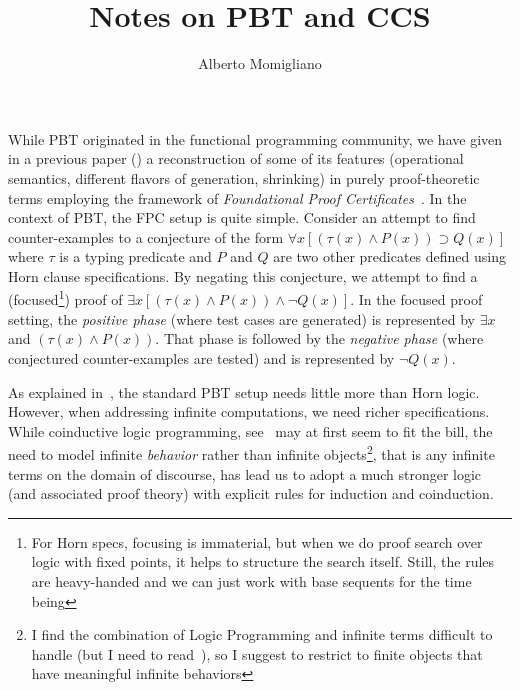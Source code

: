 \documentclass[a4paper]{easychair}
\title{Notes on PBT and CCS}
\author{Alberto Momigliano}
\institute{
DI, Universit\`a degli Studi di Milano, Italy
}
\begin{document}
\maketitle


While PBT originated in the functional programming community, we have
given in a previous paper (\cite{Blanco0M19}) a reconstruction of some
of its features (operational semantics, different flavors of
generation, shrinking) in purely proof-theoretic terms employing the
framework of \emph{Foundational Proof Certificates}~\cite{chihani17jar}.
%
In the context of PBT, the FPC setup is quite simple.
Consider an attempt to find counter-examples to a conjecture of the
form \(\forall x [(\tau(x)\wedge P(x)) \supset Q(x)]\) where $\tau$ is
a typing predicate and $P$ and $Q$ are two other predicates defined
using Horn clause specifications.
%
By negating this conjecture, we attempt to find a (focused\footnote{
For Horn specs, focusing is immaterial, but when we do proof search over logic with fixed points, it helps to structure the search itself. Still, the rules are heavy-handed and we can just work with base sequents for the time being}) proof of 
\(\exists x [(\tau(x)\land P(x)) \land \neg Q(x)]\).
%
In the focused proof setting, the \emph{positive phase} (where
test cases are generated) is represented by \(\exists x\) and
\((\tau(x)\land P(x))\). 
%
That phase is followed by the \emph{negative phase} (where conjectured
counter-examples are tested) and is represented by \(\neg Q(x)\).
%
%

As explained in~\cite{Blanco0M19}, the standard PBT setup needs little
more than Horn logic. %
%
However, when addressing infinite computations, we need richer
specifications.  While coinductive logic programming,
see~\cite{Luke07} may at first seem to fit the bill, the need to model
infinite \emph{behavior} rather than infinite objects\footnote{I find
  the combination of Logic Programming and infinite terms difficult to handle (but I need to read~\cite{BasoldKL19}), so I suggest to restrict to finite objects that have meaningful infinite behaviors}, that is any infinite
terms on the domain of discourse, has lead us to adopt a much stronger
logic (and associated proof theory) with explicit rules for induction
and coinduction.
\end{document}
